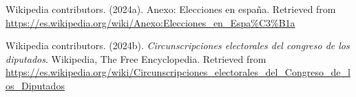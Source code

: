 \documentclass[
  letterpaper,
  DIV=11,
  numbers=noendperiod]{scrreprt}
\newlength{\cslhangindent}
\newlength{\cslentryspacingunit} %
\newenvironment{CSLReferences}[2] %
 {%
  \setlength{\parindent}{0pt}
  \ifodd #1
  \let\oldpar\par
  \def\par{\hangindent=\cslhangindent\oldpar}
  \fi
  \setlength{\parskip}{#2\cslentryspacingunit}
 }%
 {}
\begin{document}
\begin{CSLReferences}{1}{0}
\leavevmode{}%
Wikipedia contributors. (2024a). Anexo: Elecciones en españa. Retrieved
from
\url{https://es.wikipedia.org/wiki/Anexo:Elecciones_en_Espa\%C3\%B1a}

\leavevmode{}%
Wikipedia contributors. (2024b). \emph{Circunscripciones electorales del
congreso de los diputados}. Wikipedia, The Free Encyclopedia. Retrieved
from
\url{https://es.wikipedia.org/wiki/Circunscripciones_electorales_del_Congreso_de_los_Diputados}

\end{CSLReferences}



\printindex
\end{document}
